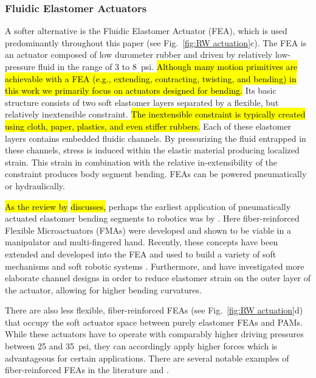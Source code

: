 \subsubsection{Fluidic Elastomer Actuators}
\label{subsubsec:RW FEA}
A softer alternative is the Fluidic Elastomer Actuator (FEA), which is used predominantly throughout this paper (see Fig.~\ref{fig:RW actuation}c).
The FEA is an actuator composed of low durometer rubber and driven by relatively low-pressure fluid in the range of 3 to 8~psi.
\hl{Although many motion primitives are achievable with a FEA (e.g., extending, contracting, twisting, and bending) in this work we primarily focus on actuators designed for bending.}
Its basic structure consists of two soft elastomer layers separated by a flexible, but relatively inextensible constraint.
\hl{The inextensible constraint is typically created using cloth, paper, plastics, and even stiffer rubbers.}
Each of these elastomer layers contains embedded fluidic channels.
By pressurizing the fluid entrapped in these channels, stress is induced within the elastic material producing localized strain. This strain in combination with the relative in-extensibility of the constraint produces body segment bending.
FEAs can be powered pneumatically or hydraulically.

\hl{As the review by} \citet{rus2014soft} \hl{discusses,} perhaps the earliest application of pneumatically actuated elastomer bending segments to robotics was by \citet{suzumori1992applying}.
Here fiber-reinforced Flexible Microactuators (FMAs) were developed and shown to be viable in a manipulator and multi-fingered hand.
Recently, these concepts have been extended and developed into the FEA and used to build a variety of soft mechanisms \citep{shepherd2011multigait, ilievski2011soft, morin2012camouflage, martinez2013robotic, katzschmann2015autonomous, marchese2015design}
and soft robotic systems
\citep{onal2011soft, marchese2011soft, onal2013autonomous, marchese2014autonomous, marchese2014design, marchese2014whole, katzschmann2014hydraulic, tolley2014untethered, tolley2014resilient, katzschmann2015autonomous, marchese2015design, marchese2015control, marchese2015dynamics}.
Furthermore, \citet{polygerinos2013towards} and \citet{mosadegh2014pneumatic} have investigated more elaborate channel designs in order to reduce elastomer strain on the outer layer of the actuator, allowing for higher bending curvatures.

There are also less flexible, fiber-reinforced FEAs (see Fig.~\ref{fig:RW actuation}d) that occupy the soft actuator space between purely elastomer FEAs and PAMs.
While these actuators have to operate with comparably higher driving pressures between 25 and 35~psi, they can accordingly apply higher forces which is advantageous for certain applications.
There are several notable examples of fiber-reinforced FEAs in the literature \citet{suzumori1992applying, suzumori2007bending, bishop2012design, galloway2013mechanically, deimel2013compliant, deimel2014novel} and \citet{park2014design}.

